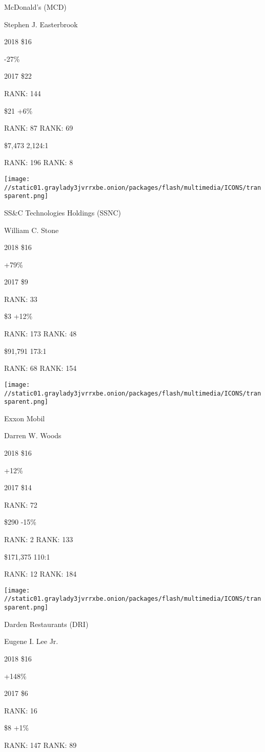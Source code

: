 McDonald's (MCD)

Stephen J. Easterbrook \protect\hyperlink{g-footnotes}{}

2018 \$16

 -27\%

2017 \$22

RANK: 144

 \$21 +6\%

RANK: 87 RANK: 69

 \$7,473 2,124:1

RANK: 196 RANK: 8

\texttt{[image: //static01.graylady3jvrrxbe.onion/packages/flash/multimedia/ICONS/transparent.png]}

SS\&C Technologies Holdings (SSNC)

William C. Stone \protect\hyperlink{g-footnotes}{}

2018 \$16

 +79\%

2017 \$9

RANK: 33

 \$3 +12\%

RANK: 173 RANK: 48

 \$91,791 173:1

RANK: 68 RANK: 154

\texttt{[image: //static01.graylady3jvrrxbe.onion/packages/flash/multimedia/ICONS/transparent.png]}

Exxon Mobil

Darren W. Woods \protect\hyperlink{g-footnotes}{}

2018 \$16

 +12\%

2017 \$14

RANK: 72

 \$290 -15\%

RANK: 2 RANK: 133

 \$171,375 110:1

RANK: 12 RANK: 184

\texttt{[image: //static01.graylady3jvrrxbe.onion/packages/flash/multimedia/ICONS/transparent.png]}

Darden Restaurants (DRI)

Eugene I. Lee Jr. \protect\hyperlink{g-footnotes}{}

2018 \$16

 +148\%

2017 \$6

RANK: 16

 \$8 +1\%

RANK: 147 RANK: 89

